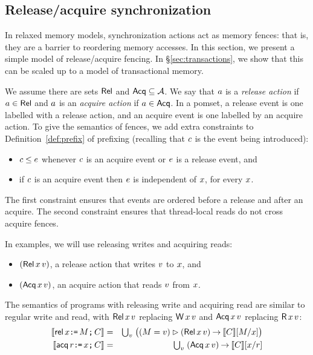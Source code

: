 \subsection{Release/acquire synchronization}
\label{sec:ra}

In relaxed memory models, synchronization actions act as memory fences: that
is, they are a barrier to reordering memory accesses.  In this section, we
present a simple model of release/acquire fencing. In
\S\ref{sec:transactions}, we show that this can be scaled up to a model of
transactional memory.

We assume there are sets $\mathsf{Rel}$ and $\mathsf{Acq} \subseteq\mathcal{A}$.  We say that
$a$ is a \emph{release action} if $a\in\mathsf{Rel}$ and $a$ is an
\emph{acquire action} if $a\in\mathsf{Acq}$.
In a pomset, a release event is one labelled with a release action,
and an acquire event is one labelled by an acquire action.
To give the semantics of fences, we add extra constraints
to Definition~\ref{def:prefix} of prefixing %
(recalling that $c$ is the %
event being introduced):
\begin{itemize}
\item $c \le e$ whenever $c$ is an acquire event or $e$ is a release event, and
\item if $c$ is an acquire event then $e$ is independent of $x$,
  for every $x$.
\end{itemize}
The first constraint ensures that events are ordered before a release and
after an acquire.  The second constraint ensures that thread-local reads do
not cross acquire fences.

In examples, we will use
releasing writes and acquiring reads:
\begin{itemize}
\item $(\DWRel{\aLoc}{\aVal})$, a release action that writes $v$ to $x$, and
\item $(\DRAcq{\aLoc}{\aVal})$, an acquire action that reads $v$ from $x$.
\end{itemize}
The semantics of programs with releasing write and acquiring read are similar
to regular write and read, with $\DWRel\aLoc\aVal$ replacing
$\DW\aLoc\aVal$ and $\DRAcq\aLoc\aVal$ replacing $\DR\aLoc\aVal$:
\begin{eqnarray*}
  \sem{\REL\aLoc\GETS\aExp\SEMI \aCmd} & = & \textstyle\bigcup_\aVal\; \bigl((\aExp=\aVal) \guard (\DWRel\aLoc\aVal) \prefix \sem{\aCmd}[\aExp/\aLoc]\bigr) \\
  \sem{\ACQ\aReg\GETS\aLoc\SEMI \aCmd} & = & \textstyle\bigcup_\aVal\; (\DRAcq\aLoc\aVal) \prefix \sem{\aCmd}[\aLoc/\aReg]
\end{eqnarray*}

